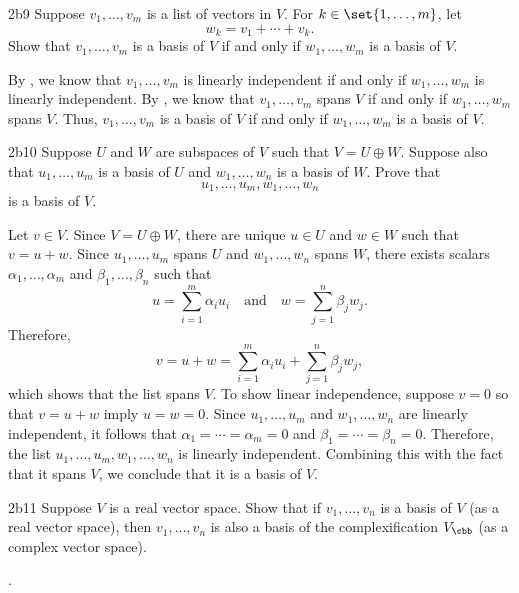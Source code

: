 \begin{exercise}{2b9}
    Suppose $v_1, \ldots, v_m$ is a list of vectors in $V$.
	For $k \in \set{1, \ldots, m}$, let
    \[
    	w_k = v_1 + \cdots + v_k.
    \]
    Show that $v_1, \ldots, v_m$ is a basis of $V$ if and only if $w_1, \ldots, w_m$ is a basis of $V$.
\end{exercise}

\begin{sol}
    By , we know that $v_1, \ldots, v_m$ is linearly independent if and only if $w_1, \ldots, w_m$ is linearly independent.
	By , we know that $v_1, \ldots, v_m$ spans $V$ if and only if $w_1, \ldots, w_m$ spans $V$.
	Thus, $v_1, \ldots, v_m$ is a basis of $V$ if and only if $w_1, \ldots, w_m$ is a basis of $V$.
\end{sol}

\begin{exercise}{2b10}
    Suppose $U$ and $W$ are subspaces of $V$ such that $V = U \oplus W$.
	Suppose also that $u_1, \ldots, u_m$ is a basis of $U$ and $w_1, \ldots, w_n$ is a basis of $W$.
	Prove that
    \[
    	u_1, \ldots, u_m, w_1, \ldots, w_n
    \]
    is a basis of $V$.
\end{exercise}

\begin{sol}
    Let $v \in V$.
    Since $V = U \oplus W$, there are unique $u \in U$ and $w \in W$ such that $v = u + w$.
    Since $u_1, \ldots, u_m$ spans $U$ and $w_1, \ldots, w_n$ spans $W$, there exists scalars $\alpha_1, \ldots, \alpha_m$ and $\beta_1, \ldots, \beta_n$ such that
    \[
        u = \sum_{i=1}^m \alpha_i u_i \quad \text{and} \quad w = \sum_{j=1}^n \beta_j w_j.
    \]
    Therefore,
    \[
        v = u + w = \sum_{i=1}^m \alpha_i u_i + \sum_{j=1}^n \beta_j w_j,
    \]
    which shows that the list spans $V$.
    To show linear independence, suppose $v = 0$ so that $v = u + w$ imply $u = w = 0$.
    Since $u_1, \ldots, u_m$ and $w_1, \ldots, w_n$ are linearly independent, it follows that $\alpha_1 = \cdots = \alpha_m = 0$ and $\beta_1 = \cdots = \beta_n = 0$.
    Therefore, the list $u_1, \ldots, u_m, w_1, \ldots, w_n$ is linearly independent.
    Combining this with the fact that it spans $V$, we conclude that it is a basis of $V$.
\end{sol}

\begin{exercise}{2b11}
    Suppose $V$ is a real vector space.
	Show that if $v_1, \ldots, v_n$ is a basis of $V$ (as a real vector space), then $v_1, \ldots, v_n$ is also a basis of the complexification $V_\cbb$ (as a complex vector space).

    .
\end{exercise}

